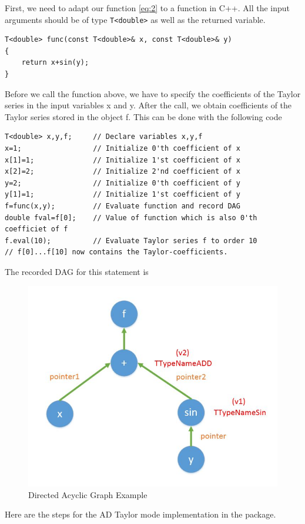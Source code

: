 First, we need to adapt our function \ref{eq:2} to a function in C++. All the input arguments should be of type \texttt{T<double>} as well as the returned variable.
\begin{lstlisting}[numbers=none]
T<double> func(const T<double>& x, const T<double>& y)
{
	return x+sin(y);
}
\end{lstlisting}
Before we call the function above, we have to specify the coefficients of the Taylor series in the input variables x and y.  After the call, we obtain coefficients of the Taylor series stored in the object f. This can be done with the following code
\begin{lstlisting}
T<double> x,y,f;     // Declare variables x,y,f
x=1;                 // Initialize 0'th coefficient of x
x[1]=1;              // Initialize 1'st coefficient of x
x[2]=2;              // Initialize 2'nd coefficient of x
y=2;                 // Initialize 0'th coefficient of y
y[1]=1;              // Initialize 1'st coefficient of y
f=func(x,y);         // Evaluate function and record DAG
double fval=f[0];    // Value of function which is also 0'th coefficiet of f
f.eval(10);          // Evaluate Taylor series f to order 10
// f[0]...f[10] now contains the Taylor-coefficients.
\end{lstlisting}
The recorded DAG for this statement is
\begin{figure}[H]
	\centering
	\includegraphics[scale=0.7]{images/DAG1}
	\caption{Directed Acyclic Graph Example}
\end{figure}
Here are the steps for the AD Taylor mode implementation in the \FADBADpp package.
